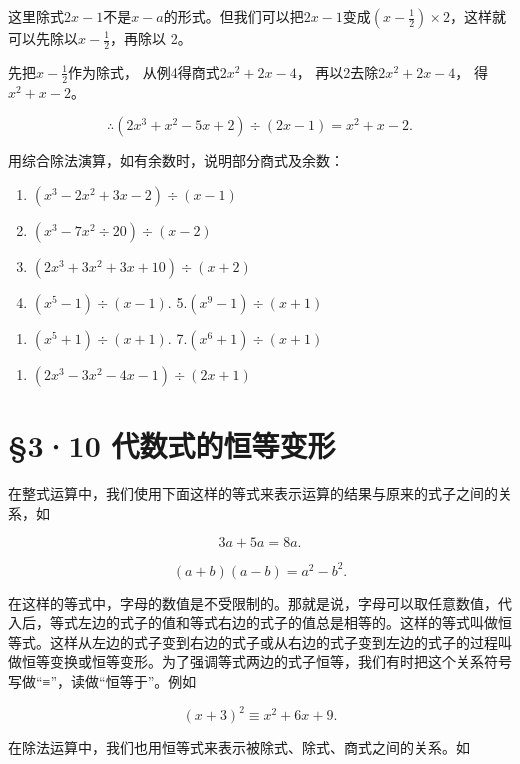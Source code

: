 这里除式\(2x - 1\)不是\(x - a\)的形式。但我们可以把\(2x - 1\)变成\(\left(x - \frac{1}{2}\right) \times 2\)，这样就可以先除以\(x - \frac{1}{2}\)，再除以
2。

 先把\(x - \frac{1}{2}\)作为除式，
从例4得商式\(2x^{2} + 2x - 4\)， 再以2去除\(2x^{2} + 2x - 4\)，
得\(x^{2} + x - 2\)。

\[
\therefore (2 x ^{3} + x ^{2} - 5 x + 2) \div (2 x - 1) = x ^{2} + x - 2.
\]

用综合除法演算，如有余数时，说明部分商式及余数：

\begin{enumerate}[start=1]
\item
  \((x^{3} - 2x^{2} + 3x - 2)\div (x - 1)\)
\item
  \((x^{3} - 7x^{2}\div 20)\div (x - 2)\)
\item
  \((2x^{3} + 3x^{2} + 3x + 10)\div (x + 2)\)
\item
  \((x^{5} - 1)\div (x - 1).\) 5.\((x^{9} - 1)\div (x + 1)\)
\end{enumerate}
\begin{enumerate}[start=6]
\item
  \((x^{5} + 1)\div (x + 1).\) 7.\((x^{6} + 1)\div (x + 1)\)
\end{enumerate}
\begin{enumerate}[start=8]
\item
  \((2x^{3} - 3x^{2} - 4x - 1)\div (2x + 1)\)
\end{enumerate}

\section{§3·10 代数式的恒等变形}

在整式运算中，我们使用下面这样的等式来表示运算的结果与原来的式子之间的关系，如

\[
3 a + 5 a = 8 a.
\]

\[
(a + b) (a - b) = a ^{2} - b ^{2}.
\]

在这样的等式中，字母的数值是不受限制的。那就是说，字母可以取任意数值，代入后，等式左边的式子的值和等式右边的式子的值总是相等的。这样的等式叫做恒等式。这样从左边的式子变到右边的式子或从右边的式子变到左边的式子的过程叫做恒等变换或恒等变形。为了强调等式两边的式子恒等，我们有时把这个关系符号写做``≡''，读做``恒等于''。例如

\[
(x + 3) ^{2} \equiv x ^{2} + 6 x + 9.
\]

在除法运算中，我们也用恒等式来表示被除式、除式、商式之间的关系。如

